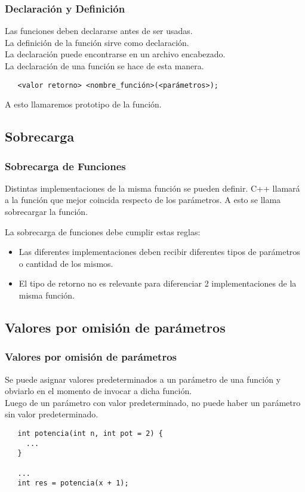 \documentclass{beamer}
\begin{document}
\begin{frame}[fragile]
\frametitle{Declaración y Definición}

Las funciones deben declararse antes de ser usadas. \\
La definición de la función sirve como declaración. \\
La declaración puede encontrarse en un archivo encabezado. \\
La declaración de una función se hace de esta manera.
\begin{verbatim}
   <valor retorno> <nombre_función>(<parámetros>);
\end{verbatim}
A esto llamaremos prototipo de la función.
\end{frame}

\subsection{Sobrecarga}
\begin{frame}[fragile]
\frametitle{Sobrecarga de Funciones}
Distintas implementaciones de la misma función se pueden definir. C++ llamará
a la función que mejor coincida respecto de los parámetros. A esto se llama sobrecargar la función.

La sobrecarga de funciones debe cumplir estas reglas:
\begin{itemize}
 \item Las diferentes implementaciones deben recibir diferentes tipos de parámetros o cantidad de los mismos.
 \item El tipo de retorno no es relevante para diferenciar 2 implementaciones de la misma función.
\end{itemize}

\end{frame}

\subsection{Valores por omisión de parámetros}
\begin{frame}[fragile]
\frametitle{Valores por omisión de parámetros}

Se puede asignar valores predeterminados a un parámetro de una función y 
obviarlo en el momento de invocar a dicha función. \\
Luego de un parámetro con valor predeterminado, no puede haber un parámetro sin valor predeterminado.

\begin{verbatim}
   int potencia(int n, int pot = 2) {
     ...
   }

   ...
   int res = potencia(x + 1);
\end{verbatim}


\end{frame}
\end{document}
